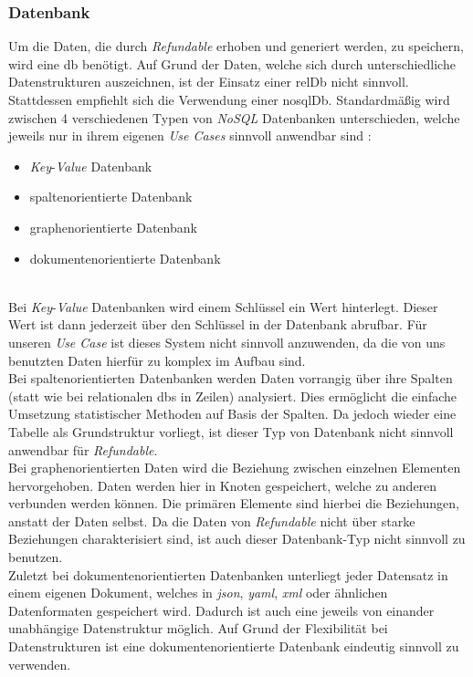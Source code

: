		\subsubsection{Datenbank}
		\label{sec:db}
		Um die Daten, die durch \textit{Refundable} erhoben und generiert werden, zu speichern, wird eine \gls{db} benötigt. Auf Grund der Daten, welche sich durch unterschiedliche Datenstrukturen auszeichnen, ist der Einsatz einer \gls{relDb} nicht sinnvoll. Stattdessen empfiehlt sich die Verwendung einer \gls{nosqlDb}.
		Standardmäßig wird zwischen 4 verschiedenen Typen von \textit{NoSQL} Datenbanken unterschieden, welche jeweils nur in ihrem eigenen \textit{Use Cases} sinnvoll anwendbar sind \cite{nosqltypes}:
		\begin{itemize}
			\item \textit{Key}-\textit{Value} Datenbank
			\item spaltenorientierte Datenbank
			\item graphenorientierte Datenbank
			\item dokumentenorientierte Datenbank
		\end{itemize}
		\label{code:nosqltypes}~\\	
		Bei \textit{Key}-\textit{Value} Datenbanken wird einem Schlüssel ein Wert hinterlegt. Dieser Wert ist dann jederzeit über den Schlüssel in der Datenbank abrufbar. Für unseren \textit{Use Case} ist dieses System nicht sinnvoll anzuwenden, da die von uns benutzten Daten hierfür zu komplex im Aufbau sind.~\\
		Bei spaltenorientierten Datenbanken werden Daten vorrangig über ihre Spalten (statt wie bei relationalen \gls{db}s in Zeilen) analysiert. Dies ermöglicht die einfache Umsetzung statistischer Methoden auf Basis der Spalten. Da jedoch wieder eine Tabelle als Grundstruktur vorliegt, ist dieser Typ von Datenbank nicht sinnvoll anwendbar für \textit{Refundable}.~\\
		Bei graphenorientierten Daten wird die Beziehung zwischen einzelnen Elementen hervorgehoben. Daten werden hier in Knoten gespeichert, welche zu anderen verbunden werden können. Die primären Elemente sind hierbei die Beziehungen, anstatt der Daten selbst. Da die Daten von \textit{Refundable} nicht über starke Beziehungen charakterisiert sind, ist auch dieser Datenbank-Typ nicht sinnvoll zu benutzen.~\\		
		Zuletzt bei dokumentenorientierten Datenbanken unterliegt jeder Datensatz in einem eigenen Dokument, welches in \textit{\Gls{json}}, \textit{\Gls{yaml}}, \textit{\Gls{xml}} oder ähnlichen Datenformaten gespeichert wird. Dadurch ist auch eine jeweils von einander unabhängige Datenstruktur möglich. Auf Grund der Flexibilität bei Datenstrukturen ist eine dokumentenorientierte Datenbank eindeutig sinnvoll zu verwenden.~\\
